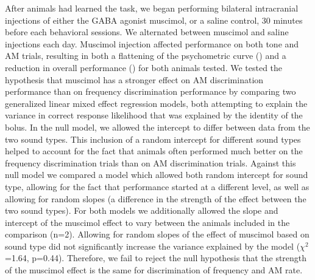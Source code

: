 After animals had learned the task, we began performing
bilateral intracranial injections of either the GABA agonist muscimol, or a
saline control, 30 minutes before each behavioral sessions.
%
We alternated between muscimol and saline injections each day. 
%
Muscimol injection affected performance on both tone and AM trials, resulting
in both a flattening of the psychometric curve (\fig{\amodPsychometrics}) and a
reduction in overall performance (\fig{\amodCorrect}) for both animals tested. 
%
We tested the hypothesis that muscimol has a stronger effect on AM
discrimination performance than on frequency discrimination performance by
comparing two generalized linear mixed effect regression models, both attempting
to explain the variance in correct response likelihood that was explained by the
identity of the bolus. 
%
In the null model, we allowed the intercept to differ between data from the two
sound types.
%
This inclusion of a random intercept for different sound types helped to account for the fact that animals often performed much better on the
frequency discrimination trials than on AM discrimination trials.
%
Against this null model we compared a model which allowed both random
intercept for sound type, allowing for the fact that performance started
at a different level, as well as allowing for random slopes (a difference in
the strength of the effect between the two sound types).
%
For both models we additionally allowed the slope and intercept of the muscimol
effect to vary between the animals included in the comparison (n=2). 
%
Allowing for random slopes of the effect of muscimol based on sound type did
not significantly increase the variance explained by the model
($\chi^{2}$=1.64, p=0.44).
%
Therefore, we fail to reject the null hypothesis that the strength of the
muscimol effect is the same for discrimination of frequency and AM rate. 

